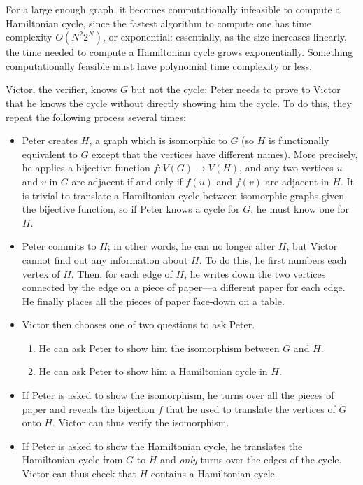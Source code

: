 \documentclass{article}
\begin{document}
\begin{multicols}{2}
For a large enough graph, it becomes computationally infeasible to compute a Hamiltonian cycle, since the fastest algorithm to compute one has time complexity $O({N}^{2}{2}^{N})$, or exponential: essentially, as the size increases linearly, the time needed to compute a Hamiltonian cycle grows exponentially. Something computationally feasible must have polynomial time complexity or less.

Victor, the verifier, knows $G$ but not the cycle; Peter needs to prove to Victor that he knows the cycle without directly showing him the cycle. To do this, they repeat the following process several times:

\begin{itemize}
    \item Peter creates $H$, a graph which is isomorphic to $G$ (so $H$ is functionally equivalent to $G$ except that the vertices have different names). More precisely, he applies a bijective function $f: V(G) \rightarrow V(H)$, and any two vertices $u$ and $v$ in $G$ are adjacent if and only if $f(u)$ and $f(v)$ are adjacent in $H$. It is trivial to translate a Hamiltonian cycle between isomorphic graphs given the bijective function, so if Peter knows a cycle for $G$, he must know one for $H$.
    \item Peter commits to $H$; in other words, he can no longer alter $H$, but Victor cannot find out any information about $H$. To do this, he first numbers each vertex of $H$. Then, for each edge of $H$, he writes down the two vertices connected by the edge on a piece of paper---a different paper for each edge. He finally places all the pieces of paper face-down on a table.
    \item Victor then chooses one of two questions to ask Peter.
    \begin{enumerate}
        \item He can ask Peter to show him the isomorphism between $G$ and $H$.
        \item He can ask Peter to show him a Hamiltonian cycle in $H$.
    \end{enumerate}
    \item If Peter is asked to show the isomorphism, he turns over all the pieces of paper and reveals the bijection $f$ that he used to translate the vertices of $G$ onto $H$. Victor can thus verify the isomorphism.
    \item If Peter is asked to show the Hamiltonian cycle, he translates the Hamiltonian cycle from $G$ to $H$ and \textit{only} turns over the edges of the cycle. Victor can thus check that $H$ contains a Hamiltonian cycle.
\end{itemize}


\end{multicols}
\end{document}
